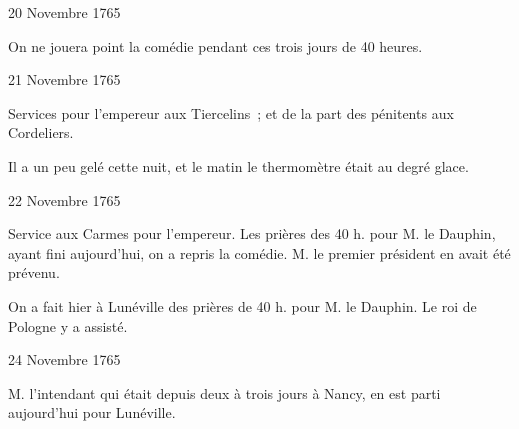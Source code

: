                      
                     \begin{diary}{20 Novembre 1765}{}
                        
                         On ne jouera point la comédie
                           pendant ces trois jours de 40 heures. \bigskip
        
        
                     \end{diary}

                     \begin{diary}{21 Novembre 1765}{}
                        
                         Services pour l'empereur aux Tiercelins ; et de
                           la part des pénitents
                           aux Cordeliers. \bigskip
        
        
                         Il a un peu gelé cette nuit, et le
                           matin
                           le thermomètre était au degré glace. \bigskip
        
        
                     \end{diary}

                     \begin{diary}{22 Novembre 1765}{}
                        
                         Service aux Carmes pour l'empereur.
                           Les prières des 40 h. pour M. le
                              Dauphin, ayant fini aujourd'hui, on a
                           repris la comédie. M. le premier président en
                           avait été prévenu. \bigskip
        
        
                         On a fait hier à Lunéville des prières
                           de 40 h. pour M. le
                              Dauphin. Le roi
                              de Pologne y a assisté. \bigskip
        
        
                     \end{diary}

                     \begin{diary}{24 Novembre 1765}{}
                        
                        
                           M. l'intendant qui était
                           depuis deux à trois
                           jours à Nancy, en est parti
                           aujourd'hui pour Lunéville. \bigskip
        
        
                     \end{diary}


